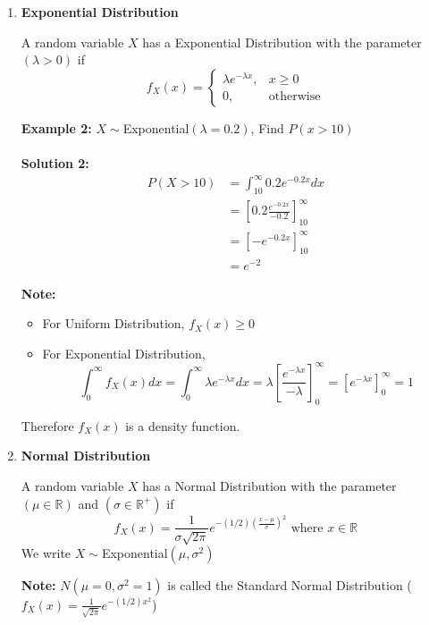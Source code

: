 \documentclass[12pt]{article}
\begin{document}
\begin{enumerate}
	\item{
	
	\textbf{Exponential Distribution}
	
	\begin{tcolorbox}[title=Defintion: Exponential Distribution]
		A random variable $X$ has a Exponential Distribution with the parameter $(\lambda > 0)$ if 
		$$f_X (x) = \begin{cases}
		\lambda e^{-\lambda x} , & x \geq 0\\
		0 , & \text{otherwise}
		\end{cases}$$
	\end{tcolorbox}
	
	\textbf{Example 2:} $X \sim $Exponential$(\lambda = 0.2)$, Find $P(x > 10)$\\
	\\
	\textbf{Solution 2:}
	\begin{align*}
		P(X > 10) &= \int^{\infty}_{10} 0.2e^{-0.2x} dx\\
		&= [0.2 \frac{e^{-0.2x}}{-0.2}]^{\infty}_{10}\\
		&= [ -e^{-0.2x}]^{\infty}_{10}\\
		&= e^{-2}
	\end{align*}
	
	\textbf{Note:}
	\begin{itemize}
		\item{For Uniform Distribution, $f_X (x) \geq 0$}
		\item{For Exponential Distribution, $$\int^{\infty}_{0} f_X (x) dx = \int^{\infty}_{0} \lambda e^{-\lambda x} dx = \lambda [\frac{e^{-\lambda x}}{-\lambda}]^{\infty}_{0} = [e^{-\lambda x}]^{\infty}_{0} = 1$$}
	\end{itemize}

	Therefore $f_X (x)$ is a density function.
	
	}
	\item{
	\textbf{Normal Distribution}
	
	\begin{tcolorbox}[title=Defintion: Normal Distribution]
		A random variable $X$ has a Normal Distribution with the parameter $(\mu \in\mathbb{R})$ and $(\sigma \in\mathbb{R}^{+})$ if 
		$$f_X (x) = \frac{1}{\sigma \sqrt{2\pi}} e^{-(1/2)(\frac{x - \mu}{\sigma})^2} \text{ where } x\in\mathbb{R}$$
		We write $X \sim $Exponential$(\mu, \sigma^2 )$
	\end{tcolorbox}
	
	\textbf{Note:} $N(\mu = 0, \sigma^2 = 1)$ is called the Standard Normal Distribution ($f_X (x) = \frac{1}{\sqrt{2\pi}} e^{-(1/2)x^2}$)
	
}
\end{enumerate}
\end{document}

